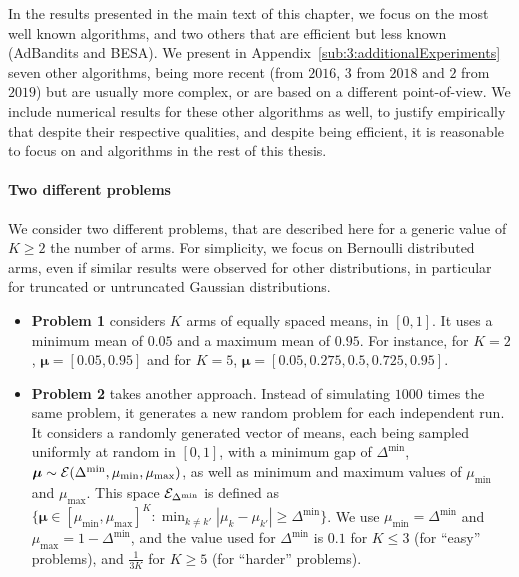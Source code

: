 In the results presented in the main text of this chapter, we focus on the most well known algorithms, and two others that are efficient but less known (AdBandits and BESA).
We present in Appendix~\ref{sub:3:additionalExperiments} seven other algorithms, being more recent (from $2016$, $3$ from $2018$ and $2$ from $2019$) but are usually more complex, or are based on a different point-of-view.
We include numerical results for these other algorithms as well, to justify empirically that despite their respective qualities, and despite being efficient, it is reasonable to focus on \UCB{} and \klUCB{} algorithms in the rest of this thesis.


\paragraph{Two different problems}

We consider two different problems, that are described here for a generic value of $K \geq 2$ the number of arms.
For simplicity, we focus on Bernoulli distributed arms, even if similar results were observed for other distributions, in particular for truncated or untruncated Gaussian distributions.

\begin{itemize}
    \item \textbf{Problem 1} considers $K$ arms of equally spaced means, in $[0,1]$.
    It uses a minimum mean of $0.05$ and a maximum mean of $0.95$.
    For instance, for $K=2$, $\bm{\mu}=[0.05, 0.95]$ and for $K=5$, $\bm{\mu} = [0.05, 0.275, 0.5, 0.725, 0.95]$.

    \item \textbf{Problem 2} takes another approach. Instead of simulating $1000$ times the same problem, it generates a new random problem for each independent run.
    It considers a randomly generated vector of means, each being sampled uniformly at random in $[0,1]$, with a minimum gap of $\Delta^{\min}$, $\bm{\mu} \sim \mathcal{E}(\Delta^{\min},\mu_{\min},\mu_{\max})$, as well as minimum and maximum values of $\mu_{\min}$ and $\mu_{\max}$.
    This space $\mathcal{E}_{\Delta^{\min}}$ is defined as $\{ \bm{\mu} \in [\mu_{\min}, \mu_{\max}]^K : \min_{k\neq k'} |\mu_k - \mu_{k'}| \geq \Delta^{\min} \}$.
    We use $\mu_{\min} = \Delta^{\min}$ and $\mu_{\max} = 1 - \Delta^{\min}$,
    and the value used for $\Delta^{\min}$ is $0.1$ for $K \leq 3$ (for ``easy'' problems), and $\frac{1}{3 K}$ for $K \geq 5$ (for ``harder'' problems).
\end{itemize}


